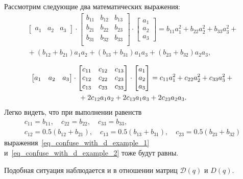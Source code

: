 \label{app_confuse_with_d}
Рассмотрим следующие два математических выражения:
\begin{multline}\label{eq_confuse_with_d_example_1}
    \begin{bmatrix}
        a_1 & a_2 & a_3
    \end{bmatrix}
    \cdot
    \begin{bmatrix}
        b_{11} & b_{12} & b_{13} \\
        b_{21} & b_{22} & b_{23} \\
        b_{31} & b_{32} & b_{33} \\
    \end{bmatrix}
    \cdot
    \begin{bmatrix}
        a_1 \\ a_2 \\ a_3
    \end{bmatrix}
    = b_{11} a_1^2 + b_{22} a_2^2 + b_{33} a_3^2 + {} \\
    {} + (b_{12} + b_{21}) a_1 a_2 + (b_{13} + b_{31}) a_1 a_3 + (b_{23} + b_{32}) a_2 a_3,
\end{multline}

\begin{multline}\label{eq_confuse_with_d_example_2}
    \begin{bmatrix}
    a_1 & a_2 & a_3
    \end{bmatrix}
    \cdot
    \begin{bmatrix}
        c_{11} & c_{12} & c_{13} \\
        c_{12} & c_{22} & c_{23} \\
        c_{13} & c_{23} & c_{33} \\
        \end{bmatrix}
    \cdot
    \begin{bmatrix}
    a_1 \\ a_2 \\ a_3
    \end{bmatrix}
    = c_{11} a_1^2 + c_{22} a_2^2 + c_{33} a_3^2 + {} \\
    {} + 2 c_{12} a_1 a_2 + 2 c_{13} a_1 a_3 + 2 c_{23} a_2 a_3 \ldotp
\end{multline}
Легко видеть, что при выполнении равенств
\begin{gather}
    c_{11} = b_{11},
    \quad
    c_{22} = b_{22},
    \quad
    c_{33} = b_{33},
    \\
    c_{12} = 0.5(b_{12}+b_{21}),
    \quad
    c_{13} = 0.5(b_{13}+b_{31}),
    \quad
    c_{23} = 0.5(b_{23}+b_{32})
\end{gather}
выражения~\eqref{eq_confuse_with_d_example_1} и~\eqref{eq_confuse_with_d_example_2} тоже будут равны.

Подобная ситуация наблюдается и в отношении матриц $\mathcal{D}(q)$ и $D(q)$.